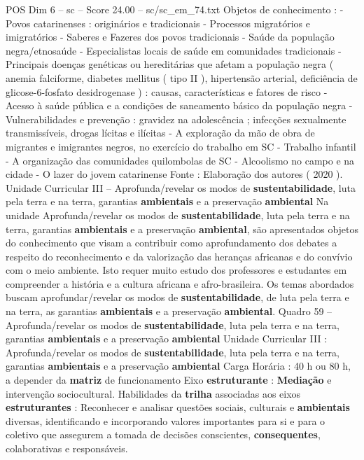 \begin{textsample}{POS Dim 6 – sc – Score 24.00 – sc/sc\_em\_74.txt}
Objetos de conhecimento : - Povos catarinenses : originários e tradicionais - Processos migratórios e imigratórios - Saberes e Fazeres dos povos tradicionais - Saúde da população negra/etnosaúde - Especialistas locais de saúde em comunidades tradicionais - Principais doenças genéticas ou hereditárias que afetam a população negra ( anemia falciforme, diabetes mellitus ( tipo II ), hipertensão arterial, deficiência de glicose-6-fosfato desidrogenase ) : causas, características e fatores de risco - Acesso à saúde pública e a condições de saneamento básico da população negra - Vulnerabilidades e prevenção : gravidez na adolescência ; infecções sexualmente transmissíveis, drogas lícitas e ilícitas - A exploração da mão de obra de migrantes e imigrantes negros, no exercício do trabalho em SC - Trabalho infantil - A organização das comunidades quilombolas de SC - Alcoolismo no campo e na cidade - O lazer do jovem catarinense Fonte : Elaboração dos autores ( 2020 ).
Unidade Curricular III – Aprofunda/revelar os modos de \textbf{sustentabilidade}, luta pela terra e na terra, garantias \textbf{ambientais} e a preservação \textbf{ambiental} Na unidade Aprofunda/revelar os modos de \textbf{sustentabilidade}, luta pela terra e na terra, garantias \textbf{ambientais} e a preservação \textbf{ambiental}, são apresentados objetos do conhecimento que visam a contribuir como aprofundamento dos debates a respeito do reconhecimento e da valorização das heranças africanas e do convívio com o meio ambiente.
Isto requer muito estudo dos professores e estudantes em compreender a história e a cultura africana e afro-brasileira.
Os temas abordados buscam aprofundar/revelar os modos de \textbf{sustentabilidade}, de luta pela terra e na terra, as garantias \textbf{ambientais} e a preservação \textbf{ambiental}.
Quadro 59 – Aprofunda/revelar os modos de \textbf{sustentabilidade}, luta pela terra e na terra, garantias \textbf{ambientais} e a preservação \textbf{ambiental} Unidade Curricular III : Aprofunda/revelar os modos de \textbf{sustentabilidade}, luta pela terra e na terra, garantias \textbf{ambientais} e a preservação \textbf{ambiental} Carga Horária : 40 h ou 80 h, a depender da \textbf{matriz} de funcionamento Eixo \textbf{estruturante} : \textbf{Mediação} e intervenção sociocultural.
Habilidades da \textbf{trilha} associadas aos eixos \textbf{estruturantes} : Reconhecer e analisar questões sociais, culturais e \textbf{ambientais} diversas, identificando e incorporando valores importantes para si e para o coletivo que assegurem a tomada de decisões conscientes, \textbf{consequentes}, colaborativas e responsáveis.

\end{textsample}
